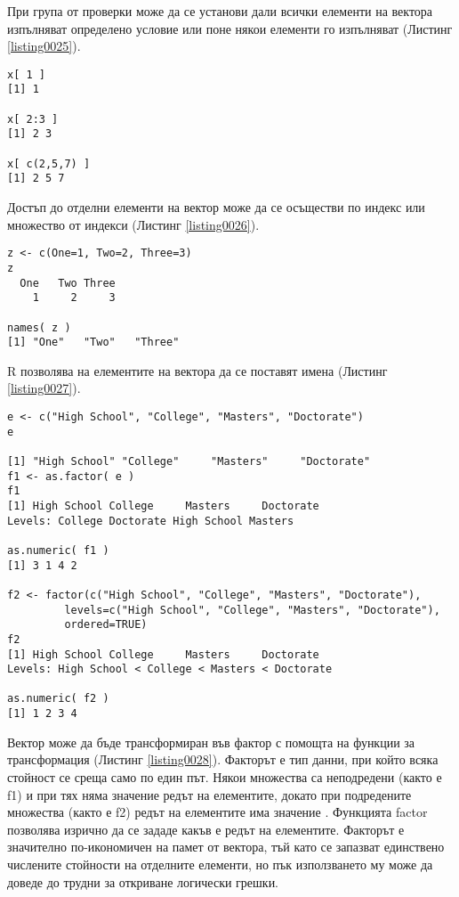 При група от проверки може да се установи дали всички елементи на вектора изпълняват определено условие или поне някои елементи го изпълняват (Листинг \ref{listing0025}).

\begin{lstlisting}[caption=Достъп до отделни елементи на вектор, label=listing0026]
x[ 1 ]
[1] 1

x[ 2:3 ]
[1] 2 3

x[ c(2,5,7) ]
[1] 2 5 7
\end{lstlisting}

Достъп до отделни елементи на вектор може да се осъществи по индекс или множество от индекси (Листинг \ref{listing0026}).

\begin{lstlisting}[caption=Имена на елементите на вектора, label=listing0027]
z <- c(One=1, Two=2, Three=3)
z
  One   Two Three 
    1     2     3 

names( z )
[1] "One"   "Two"   "Three"
\end{lstlisting}

R позволява на елементите на вектора да се поставят имена (Листинг \ref{listing0027}).

\begin{lstlisting}[caption=Трансформация на вектор във фактор, label=listing0028]
e <- c("High School", "College", "Masters", "Doctorate")
e

[1] "High School" "College"     "Masters"     "Doctorate"  
f1 <- as.factor( e )
f1
[1] High School College     Masters     Doctorate  
Levels: College Doctorate High School Masters

as.numeric( f1 )
[1] 3 1 4 2

f2 <- factor(c("High School", "College", "Masters", "Doctorate"), 
		 levels=c("High School", "College", "Masters", "Doctorate"),
		 ordered=TRUE)
f2
[1] High School College     Masters     Doctorate  
Levels: High School < College < Masters < Doctorate

as.numeric( f2 )
[1] 1 2 3 4
\end{lstlisting}

Вектор може да бъде трансформиран във фактор с помощта на функции за трансформация (Листинг \ref{listing0028}). Факторът е тип данни, при който всяка стойност се среща само по един път. Някои множества са неподредени (както е f1) и при тях няма значение редът на елементите, докато при подредените множества (както е f2) редът на елементите има значение . Функцията factor позволява изрично да се зададе какъв е редът на елементите. Факторът е значително по-икономичен на памет от вектора, тъй като се запазват единствено числените стойности на отделните елементи, но пък използването му може да доведе до трудни за откриване логически грешки.

